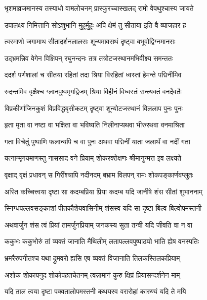 
\twolineshloka
{भृशमाव्रजमानस्य तस्याधो वामलोचनम्}
{प्रास्फुरच्चास्खलद् रामो वेपथुश्चास्य जायते} %

\twolineshloka
{उपालक्ष्य निमित्तानि सोऽशुभानि मुहुर्मुहुः}
{अपि क्षेमं तु सीताया इति वै व्याजहार ह} %

\twolineshloka
{त्वरमाणो जगामाथ सीतादर्शनलालसः}
{शून्यमावसथं दृष्ट्वा बभूवोद्विग्नमानसः} %

\twolineshloka
{उद्भ्रमन्निव वेगेन विक्षिपन् रघुनन्दनः}
{तत्र तत्रोटजस्थानमभिवीक्ष्य समन्ततः} %

\twolineshloka
{ददर्श पर्णशालां च सीतया रहितां तदा}
{श्रिया विरहितां ध्वस्तां हेमन्ते पद्मिनीमिव} %

\twolineshloka
{रुदन्तमिव वृक्षैश्च ग्लानपुष्पमृगद्विजम्}
{श्रिया विहीनं विध्वस्तं सन्त्यक्तं वनदैवतैः} %

\twolineshloka
{विप्रकीर्णाजिनकुशं विप्रविद्धबृसीकटम्}
{दृष्ट्वा शून्योटजस्थानं विललाप पुनः पुनः} %

\twolineshloka
{हृता मृता वा नष्टा वा भक्षिता वा भविष्यति}
{निलीनाप्यथवा भीरुरथवा वनमाश्रिता} %

\twolineshloka
{गता विचेतुं पुष्पाणि फलान्यपि च वा पुनः}
{अथवा पद्मिनीं याता जलार्थं वा नदीं गता} %

\twolineshloka
{यत्नान्मृगयमाणस्तु नाससाद वने प्रियाम्}
{शोकरक्तेक्षणः श्रीमानुन्मत्त इव लक्ष्यते} %

\twolineshloka
{वृक्षाद् वृक्षं प्रधावन् स गिरींश्चापि नदीनदम्}
{बभ्राम विलपन् रामः शोकपङ्कार्णवप्लुतः} %

\twolineshloka
{अस्ति कच्चित्त्वया दृष्टा सा कदम्बप्रिया प्रिया}
{कदम्ब यदि जानीषे शंस सीतां शुभाननाम्} %

\twolineshloka
{स्निग्धपल्लवसङ्काशां पीतकौशेयवासिनीम्}
{शंसस्व यदि सा दृष्टा बिल्व बिल्वोपमस्तनी} %

\twolineshloka
{अथवार्जुन शंस त्वं प्रियां तामर्जुनप्रियाम्}
{जनकस्य सुता तन्वी यदि जीवति वा न वा} %

\twolineshloka
{ककुभः ककुभोरुं तां व्यक्तं जानाति मैथिलीम्}
{लतापल्लवपुष्पाढ्यो भाति ह्येष वनस्पतिः} %

\twolineshloka
{भ्रमरैरुपगीतश्च यथा द्रुमवरो ह्यसि}
{एष व्यक्तं विजानाति तिलकस्तिलकप्रियाम्} %

\twolineshloka
{अशोक शोकापनुद शोकोपहतचेतनम्}
{त्वन्नामानं कुरु क्षिप्रं प्रियासन्दर्शनेन माम्} %

\twolineshloka
{यदि ताल त्वया दृष्टा पक्वतालोपमस्तनी}
{कथयस्व वरारोहां कारुण्यं यदि ते मयि} %

